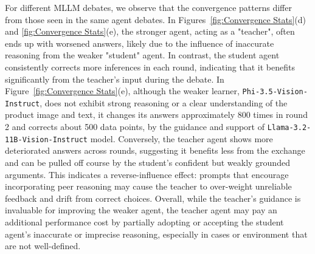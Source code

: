 \documentclass[11pt]{article}
\newcommand{\llamaname}{Llama-3.2-11B-Vision-Instruct}
\newcommand{\phiname}{Phi-3.5-Vision-Instruct}
\begin{document}
For different MLLM debates, we observe that the convergence patterns differ from those seen in the same agent debates. In Figures~\ref{fig:Convergence Stats}(d) and \ref{fig:Convergence Stats}(e), the stronger agent, acting as a "teacher", often ends up with worsened answers, likely due to the influence of inaccurate reasoning from the weaker "student" agent. In contrast, the student agent consistently corrects more inferences in each round, indicating that it benefits significantly from the teacher's input during the debate. In Figure~\ref{fig:Convergence Stats}(e), although the weaker learner, \texttt{\phiname}, does not exhibit strong reasoning or a clear understanding of the product image and text, it changes its answers approximately 800 times in round 2 and corrects about 500 data points, by the guidance and support of \texttt{\llamaname} model. Conversely, the teacher agent shows more deteriorated answers across rounds, suggesting it benefits less from the exchange and can be pulled off course by the student’s confident but weakly grounded arguments. This indicates a reverse-influence effect: prompts that encourage incorporating peer reasoning may cause the teacher to over-weight unreliable feedback and drift from correct choices. Overall, while the teacher’s guidance is invaluable for improving the weaker agent, the teacher agent may pay an additional performance cost by partially adopting or accepting the student agent’s inaccurate or imprecise reasoning, especially in cases or environment that are not well-defined.
\end{document}
